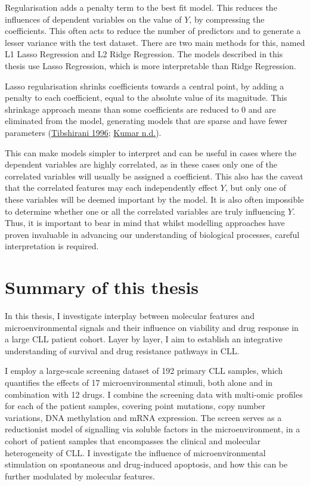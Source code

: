 \documentclass[11pt, a4paper, twosided]{book}
\begin{document}
Regularisation adds a penalty term to the best fit model. This reduces the influences of dependent variables on the value of \(Y\), by compressing the coefficients. This often acts to reduce the number of predictors and to generate a lesser variance with the test dataset. There are two main methods for this, named L1 Lasso Regression and L2 Ridge Regression. The models described in this thesis use Lasso Regression, which is more interpretable than Ridge Regression.

Lasso regularisation shrinks coefficients towards a central point, by adding a penalty to each coefficient, equal to the absolute value of its magnitude. This shrinkage approach means than some coefficients are reduced to 0 and are eliminated from the model, generating models that are sparse and have fewer parameters (\protect\hyperlink{ref-Tibshirani1996}{Tibshirani 1996}; \protect\hyperlink{ref-Kumar}{Kumar n.d.}).

This can make models simpler to interpret and can be useful in cases where the dependent variables are highly correlated, as in these cases only one of the correlated variables will usually be assigned a coefficient. This also has the caveat that the correlated features may each independently effect \(Y\), but only one of these variables will be deemed important by the model. It is also often impossible to determine whether one or all the correlated variables are truly influencing \(Y\). Thus, it is important to bear in mind that whilst modelling approaches have proven invaluable in advancing our understanding of biological processes, careful interpretation is required.

\hypertarget{summary-of-this-thesis}{%
\section{Summary of this thesis}\label{summary-of-this-thesis}}

In this thesis, I investigate interplay between molecular features and microenvironmental signals and their influence on viability and drug response in a large CLL patient cohort. Layer by layer, I aim to establish an integrative understanding of survival and drug resistance pathways in CLL.

I employ a large-scale screening dataset of 192 primary CLL samples, which quantifies the effects of 17 microenvironmental stimuli, both alone and in combination with 12 drugs. I combine the screening data with multi-omic profiles for each of the patient samples, covering point mutations, copy number variations, DNA methylation and mRNA expression. The screen serves as a reductionist model of signalling via soluble factors in the microenvironment, in a cohort of patient samples that encompasses the clinical and molecular heterogeneity of CLL. I investigate the influence of microenvironmental stimulation on spontaneous and drug-induced apoptosis, and how this can be further modulated by molecular features.
\end{document}
